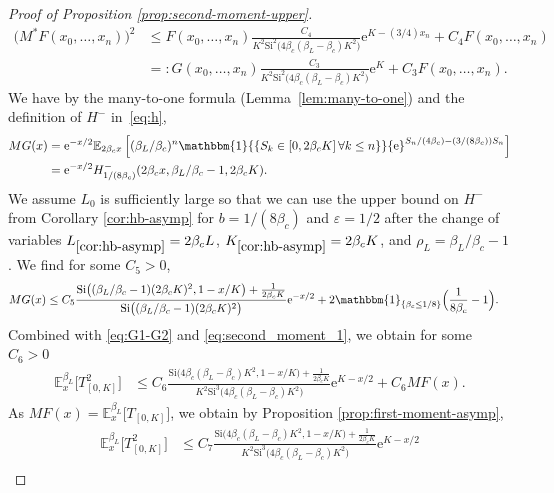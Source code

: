 \documentclass[a4paper, a4wide, 10pt, reqno]{amsart}
\theoremstyle{plain}
\theoremstyle{definition}
\numberwithin{equation}{section}
\newcommand{\E}{\mathbb E}
\newcommand{\re}{{\mathrm e}}
\newcommand{\Si}{{\mathrm{Si}}}
\newcommand{\ind}[1]{\mathbbm{1}_{\{#1\}}}
\newcommand{\Ind}[1]{\mathbbm{1}{\{#1\}}}
\begin{document}
\begin{proof}[Proof of  Proposition \ref{prop:second-moment-upper}]
    \begin{align}
    \big(M^\ast F(x_0,\ldots, x_n)\big)^2 &\le F(x_0,\ldots, x_n)\frac{C_4}{ K^2\Si^2\big(4\beta_c({\beta_L}-\beta_c) K^2\big)}\re^{ K-(3/4)x_n} + C_4F(x_0,\ldots, x_n)\nonumber \\&=:G(x_0,\ldots, x_n)\frac{C_3}{ K^2\Si^2\big(4\beta_c({\beta_L}-\beta_c) K^2\big)}\re^{ K} +  C_3F(x_0,\ldots, x_n).\label{eq:G1-G2}
    \end{align}
	We have by the many-to-one formula (Lemma~\ref{lem:many-to-one}) and the definition of $H^-$ in~\eqref{eq:h},
    \begin{equation}\label{eq:second_moment_6}
	\begin{aligned}
		MG(x) &= \re^{-x/2} \E_{2\beta_cx}
        \left[({\beta_L}/\beta_c)^n\Ind{S_k\in [0,2\beta_c K]\,\forall k\le n}\re^{S_n/(4\beta_c)-(3/(8\beta_c))S_n}\right] \\
        &= \re^{-x/2}H^-_{ 1/(8\beta_c)}(2\beta_cx, {\beta_L}/\beta_c-1, 2\beta_c K).
	\end{aligned}
    \end{equation}
    We assume $L_0$ is sufficiently large so that we can use the upper bound on $H^-$ from Corollary \ref{cor:hb-asymp} for $b=1/(8\beta_c)$ and $\varepsilon=1/2$ after the change of variables $L_{\ref{cor:hb-asymp}}=2\beta_cL$, $K_{\ref{cor:hb-asymp}}=2\beta_cK$, and $\rho_L=\beta_L/\beta_c-1$. We find for some $C_5>0$,
    \[
    \begin{aligned}
    MG(x)&\le C_5\frac{\Si\big(({\beta_L}/\beta_c-1)(2\beta_c  K)^2, 1-x/ K\big)+\frac{1}{2\beta_c K}}{\Si\big(({\beta_L}/\beta_c-1)(2\beta_c K)^2\big)}  \re^{-x/2} +2\ind{\beta_c\le 1/8}\Big(\frac{1}{8\beta_c}-1\Big). 
    \end{aligned}
    \]
        Combined with \eqref{eq:G1-G2} and \eqref{eq:second_moment_1}, we obtain for some $C_6>0$ 
    \[
    \begin{aligned}
    \E_x^{\beta_L}\big[T_{[0, K]}^2\big] &\le C_6\frac{\Si\big(4\beta_c(\beta_L-\beta_c) K^2, 1-x/ K\big)+\frac{1}{2\beta_c K}}{ K^2\Si^3\big(4\beta_c(\beta_L-\beta_c) K^2\big)}\re^{ K-x/2}+ C_6 MF(x).
    \end{aligned}
    \]
    As $MF(x)=\E_x^{\beta_L}\big[T_{[0,  K]}\big]$, we obtain by Proposition \ref{prop:first-moment-asymp},
    \begin{equation}\label{eq:second-mom-three-terms}
    \begin{aligned}
    \E_x^{\beta_L}\big[T_{[0, K]}^2\big] &\le C_7\frac{\Si\big(4\beta_c(\beta_L-\beta_c) K^2, 1-x/ K\big)+\frac{1}{2\beta_c K}}{ K^2\Si^3\big(4\beta_c(\beta_L-\beta_c) K^2\big)}\re^{ K-x/2}  \\

\end{aligned}
\end{equation}
\end{proof}
\end{document}
